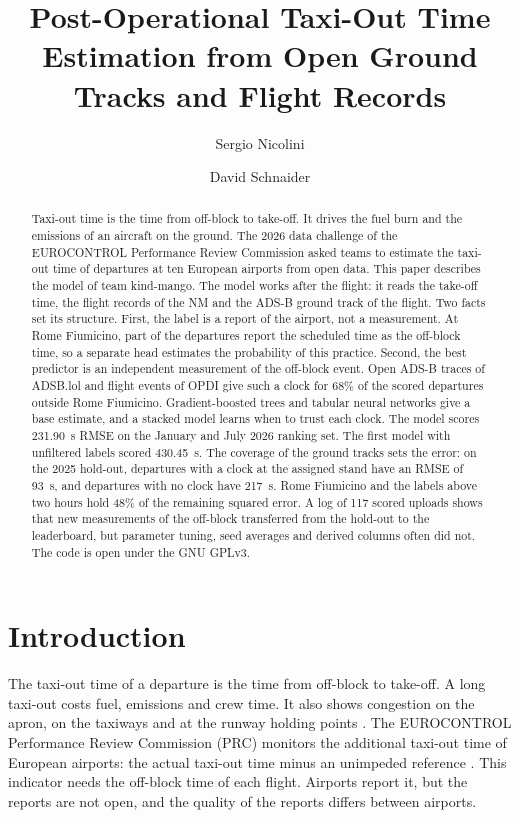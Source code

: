 \documentclass[
  manuscript=article,
  layout=preprint,
  year=2026,
  volume=x,
]{extra/joas}
\title{Post-Operational Taxi-Out Time Estimation from Open Ground Tracks and Flight Records}
\author{Sergio Nicolini}
\affiliation{SkyLink API (independent), Italy}
\author{David Schnaider}
\affiliation{SkyLink API (independent), Italy}
\begin{document}
\begin{abstract}
Taxi-out time is the time from off-block to take-off. It drives the fuel burn and the emissions of an aircraft on the ground. The 2026 data challenge of the EUROCONTROL Performance Review Commission asked teams to estimate the taxi-out time of departures at ten European airports from open data. This paper describes the model of team kind-mango. The model works after the flight: it reads the take-off time, the flight records of the NM and the ADS-B ground track of the flight. Two facts set its structure. First, the label is a report of the airport, not a measurement. At Rome Fiumicino, part of the departures report the scheduled time as the off-block time, so a separate head estimates the probability of this practice. Second, the best predictor is an independent measurement of the off-block event. Open ADS-B traces of ADSB.lol and flight events of OPDI give such a clock for 68\% of the scored departures outside Rome Fiumicino. Gradient-boosted trees and tabular neural networks give a base estimate, and a stacked model learns when to trust each clock. The model scores 231.90~s RMSE on the January and July 2026 ranking set. The first model with unfiltered labels scored 430.45~s. The coverage of the ground tracks sets the error: on the 2025 hold-out, departures with a clock at the assigned stand have an RMSE of 93~s, and departures with no clock have 217~s. Rome Fiumicino and the labels above two hours hold 48\% of the remaining squared error. A log of 117 scored uploads shows that new measurements of the off-block transferred from the hold-out to the leaderboard, but parameter tuning, seed averages and derived columns often did not. The code is open under the GNU GPLv3.
\end{abstract}


\section{Introduction}

The taxi-out time of a departure is the time from off-block to take-off. A long taxi-out costs fuel, emissions and crew time. It also shows congestion on the apron, on the taxiways and at the runway holding points \cite{simaiakis2010impact}. The EUROCONTROL Performance Review Commission (PRC) monitors the additional taxi-out time of European airports: the actual taxi-out time minus an unimpeded reference \cite{eurocontrolperf}. This indicator needs the off-block time of each flight. Airports report it, but the reports are not open, and the quality of the reports differs between airports.
\end{document}

